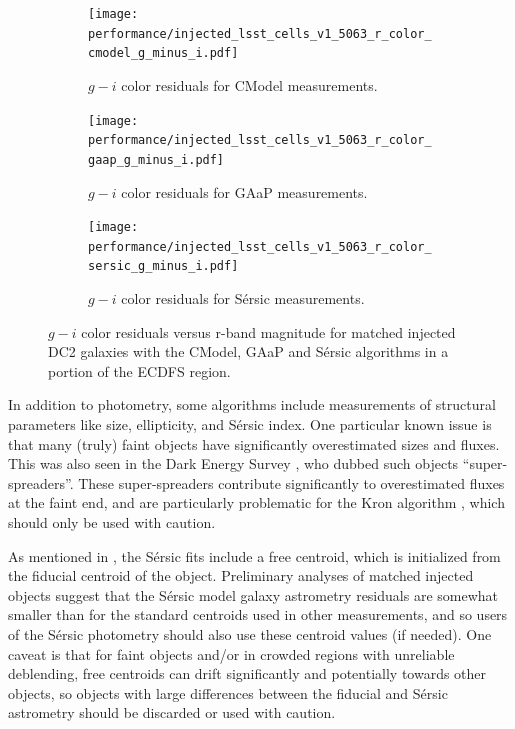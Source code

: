 \begin{figure}[hbt!]
  \centering
  \begin{subfigure}[t]{0.31\textwidth}
\texttt{[image: performance/injected\_lsst\_cells\_v1\_5063\_r\_color\_cmodel\_g\_minus\_i.pdf]}
  \caption{$g-i$ color residuals for CModel measurements.}
  \end{subfigure}\hfill
  \begin{subfigure}[t]{0.31\textwidth}
\texttt{[image: performance/injected\_lsst\_cells\_v1\_5063\_r\_color\_gaap\_g\_minus\_i.pdf]}
  \caption{$g-i$ color residuals for \gls{GAaP} measurements.}
  \end{subfigure}\hfill
    \begin{subfigure}[t]{0.31\textwidth}
\texttt{[image: performance/injected\_lsst\_cells\_v1\_5063\_r\_color\_sersic\_g\_minus\_i.pdf]}
  \caption{$g-i$ color residuals for S\'ersic measurements.}
  \end{subfigure}\hfill
\caption{$g-i$ color residuals versus r-band magnitude for matched injected DC2 galaxies with the CModel, \gls{GAaP} and S\'ersic algorithms in a portion of the \gls{ECDFS} region.}
\label{fig:injected_lsst_cells_v1_5063_r_color_g_minus_i}
\vspace{0.1cm}
\end{figure}
In addition to photometry, some algorithms include measurements of structural parameters like size, ellipticity, and S\'ersic index.
One particular known issue is that many (truly) faint objects have significantly overestimated sizes and fluxes.
This was also seen in the Dark Energy Survey \citep{2025arXiv250105739B}, who dubbed such objects ``super-spreaders''.
These super-spreaders contribute significantly to overestimated fluxes at the faint end, and are particularly problematic for the Kron algorithm \citep{1980ApJS...43..305K}, which should only be used with caution.

As mentioned in , the S\'ersic fits include a free centroid, which is initialized from the fiducial centroid of the object.
Preliminary analyses of matched injected objects suggest that the S\'ersic model galaxy \gls{astrometry} residuals are somewhat smaller than for the standard centroids used in other measurements, and so users of the S\'ersic photometry should also use these centroid values (if needed).
One caveat is that for faint objects and/or in crowded regions with unreliable deblending, free centroids can drift significantly and potentially towards other objects, so objects with large differences between the fiducial and S\'ersic \gls{astrometry} should be discarded or used with caution.

